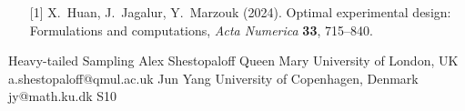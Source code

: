 \begin{session}
 \medskip
 \begin{enumerate}
 \item[{[1]}] X.\ Huan, J.\ Jagalur, Y.\ Marzouk (2024). Optimal experimental design: Formulations and computations, \textit{Acta Numerica} \textbf{33}, 715--840.
 \end{enumerate}
\end{session}



\clearpage

\begin{session}
 {Heavy-tailed Sampling}%
 {Alex Shestopaloff}%
 {Queen Mary University of London, UK}%
 {a.shestopaloff@qmul.ac.uk}%
 {Jun Yang}%
 {University of Copenhagen, Denmark}%
 {jy@math.ku.dk}%
 {S10}%
{}


\end{session}
